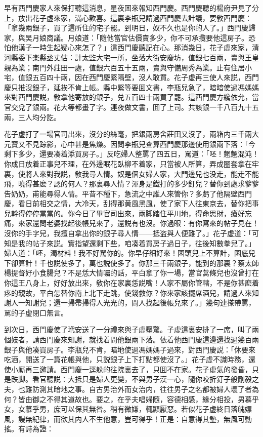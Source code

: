 早有西門慶家人來保打聽這消息，星夜囬來報知西門慶。西門慶聽的楊府尹見了分上，放出花子虚來家，滿心歡喜。這裏李瓶兒請過西門慶去計議，要敎西門慶：「拿幾兩銀子，買了這所住的宅子罷。到明日，奴不久也是你的人了。」西門慶歸家，與吴月娘商議。月娘道：「隨他當官估價賣多少，你不可承攬要他這房子。恐怕他漢子一時生起疑心來怎了？」這西門慶聽記在心。那消幾日，花子虚來家，清河縣委下楽縣丞丈估：計太監大宅一所，坐落大街安慶坊，值銀七百兩，賣與王皇親為業；南門外莊田一處，值銀六百五十五兩，賣與守備周秀為業。止有住居小宅，值銀五百四十兩，因在西門慶緊隔壁，沒人敢買。花子虚再三使人來説，西門慶只推沒銀子，延挨不肯上帳。縣中緊等要囬文書，李瓶兒急了，暗暗使過馮媽媽來對西門慶説，敎拿他寄放的銀子，兑五百四十兩買了罷。這西門慶方纔依允，當官交兌了銀兩。花大等都畫了字。連夜做文書，囬了上司。共該銀一千八百九十五兩，三人均分訖。

花子虚打了一場官司出來，沒分的絲毫，把銀兩房舍莊田又沒了，兩箱内三千兩大元寳又不見踪影，心中甚是焦燥。因問李瓶兒查算西門慶那邊使用銀兩下落：「今剩下多少，還要凑着添買房子。」反吃婦人整罵了四五日，駡道：「呸！魍魎混沌！你成日放着正事兒不理，在外邊眠花臥柳不着家，只當被人所算，弄成圈套拿在牢裏，使將人來對我説，敎我尋人情。奴是個女婦人家，大門邊兒也没走，能走不能飛，曉得甚麽？認的何人？那裏尋人情？渾身是鐵打的多少釘兒？替你到處求爹爹告奶奶，甫能尋得人情。平昔不種下，急流之中誰人來管你？多虧了他隔壁西門慶，看日前相交之情，大冷天，刮得那黄風黑風，使了家下人往東京去，替你把事兒幹得停停當當的。你今日了畢官司出來，兩脚踏住平川地，得命思財，瘡好忘痛，來家還問老婆找起後帳兒來了，還説有也沒。你過眼：有你寫來的帖子見在！沒你的手字兒，我擅自拿出你的銀子尋人情——抵盗與人便難了。」花子虚道：「可知是我的帖子來説。實指望還剩下些，咱凑着買房子過日子，往後知數拳兒了。」婦人道：「呸，濁材料！我不好駡你的。你早仔細好來！囷頭兒上不算計，囷底兒下卻算計！千也説使多了，萬也説使多了。你那三千兩銀子，能到的那裏？蔡太師楊提督好小食腸兒？不是恁大情囑的話，平白拿了你一場，當官蒿條兒也沒曾打在你這王八身上，好好放出來，敎你在家裏恁説嘴！人家不屬你管轄，不是你甚麽着疼的親故，平白怎替你南上北下走跳，使錢救你？你來家該擺席酒兒，請過人來知謝人一知謝兒；還一掃帚掃得人光光的，問人找起後帳兒來了。」幾句連搽帶罵，駡的子虚閉口無言。

到次日，西門慶使了玳安送了一分禮來與子虚壓驚。子虚這裏安排了一席，叫了兩個妓者，請西門慶來知謝，就找着問他銀兩下落。依着他西門慶這邊還找過幾百兩銀子與他凑買房子。李瓶兒不肯，暗地使過馮媽媽子過來，對西門慶説：「休要來吃酒，開送了一篇花帳與他，只説銀子上下打點都使沒了。」花子虚不識時務，還使小廝再三邀請。西門慶一逕躲的往院裏去了，只囬不在家。花子虚氣的發昏，只是跌脚。看官聽説：大抵只是婦人更變，不與男子漢一心，隨你咬折釘子般剛毅之夫，也難防測其暗地之事。自古男治外而女治内，往往男子之名都被婦人壞了者為何？皆由御之不得其道故也。要之，在乎夫唱婦隨，容德相感，緣分相投，男慕乎女，女慕乎男，庶可以保其無咎。稍有微嫌，輒顯厭惡。若似花子虚終日落魄嫖風，謾無紀律，而欲其内人不生他意，豈可得乎！正是：自意得其墊，無風可動搖。有詩為證：

